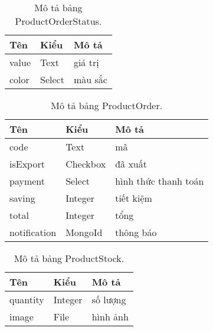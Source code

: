 \begin{table}[h!]
\begin{center}
	\caption{Mô tả bảng ProductOrderStatus.}
	\begin{tabular}{ |l|l|l| } 
	\hline
	Tên & Kiểu & Mô tả \\
	\hline
	value & Text & giá trị \\
color & Select & màu sắc \\ 
	\hline
\end{tabular}
	\label{table:ProductOrderStatus}
\end{center}
\end{table}


\begin{table}[h!]
\begin{center}
	\caption{Mô tả bảng ProductOrder.}
	\begin{tabular}{ |l|l|l| } 
	\hline
	Tên & Kiểu & Mô tả \\
	\hline
	code & Text & mã \\
isExport & Checkbox & đã xuất \\
payment & Select & hình thức thanh toán \\
saving & Integer & tiết kiệm \\
total & Integer & tổng \\
notification & MongoId & thông báo \\ 
	\hline
\end{tabular}
	\label{table:ProductOrder}
\end{center}
\end{table}


\begin{table}[h!]
\begin{center}
	\caption{Mô tả bảng ProductStock.}
	\begin{tabular}{ |l|l|l| } 
	\hline
	Tên & Kiểu & Mô tả \\
	\hline
	quantity & Integer & số lượng \\
image & File & hình ảnh \\ 
	\hline
\end{tabular}
	\label{table:ProductStock}
\end{center}
\end{table}


